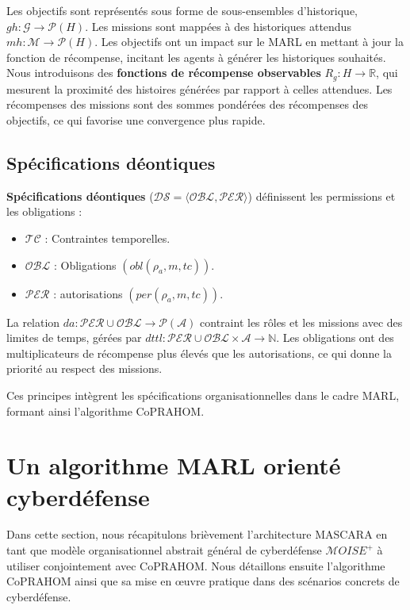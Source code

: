 Les objectifs sont représentés sous forme de sous-ensembles d'historique, $gh: \mathcal{G} \rightarrow \mathcal{P}(H)$. Les missions sont mappées à des historiques attendus $mh: \mathcal{M} \rightarrow \mathcal{P}(H)$. Les objectifs ont un impact sur le MARL en mettant à jour la fonction de récompense, incitant les agents à générer les historiques souhaités. Nous introduisons des \textbf{fonctions de récompense observables} $R_g: H \rightarrow \mathbb{R}$, qui mesurent la proximité des histoires générées par rapport à celles attendues. Les récompenses des missions sont des sommes pondérées des récompenses des objectifs, ce qui favorise une convergence plus rapide.

\subsection{Spécifications déontiques}

\textbf{Spécifications déontiques} ($\mathcal{DS} = \langle \mathcal{OBL}, \mathcal{PER} \rangle$) définissent les permissions et les obligations :
\begin{itemize}
  \item $\mathcal{TC}$ : Contraintes temporelles.
  \item $\mathcal{OBL}$ : Obligations $(obl(\rho_a, m, tc))$.
  \item $\mathcal{PER}$ : autorisations $(per(\rho_a, m, tc))$.
\end{itemize}

La relation $da: \mathcal{PER} \cup \mathcal{OBL} \rightarrow \mathcal{P}(\mathcal{A})$ contraint les rôles et les missions avec des limites de temps, gérées par $dttl: \mathcal{PER} \cup \mathcal{OBL} \times \mathcal{A} \rightarrow \mathbb{N}$. Les obligations ont des multiplicateurs de récompense plus élevés que les autorisations, ce qui donne la priorité au respect des missions.

Ces principes intègrent les spécifications organisationnelles dans le cadre MARL, formant ainsi l'algorithme CoPRAHOM.

\section{Un algorithme MARL orienté cyberdéfense}\label{sec:coprahom}

Dans cette section, nous récapitulons brièvement l'architecture MASCARA en tant que modèle organisationnel abstrait général de cyberdéfense $\mathcal{M}OISE^+$ à utiliser conjointement avec CoPRAHOM.
Nous détaillons ensuite l'algorithme CoPRAHOM ainsi que sa mise en œuvre pratique dans des scénarios concrets de cyberdéfense.

